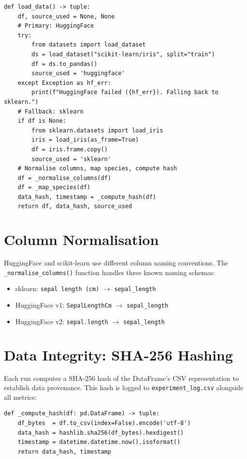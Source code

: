 \documentclass[12pt, a4paper]{report}
\newcommand{\code}[1]{\texttt{\small\textcolor{primary}{#1}}}
\begin{document}
\begin{lstlisting}[caption={Data loading with HuggingFace-to-sklearn fallback},
                   label={lst:dataloader}]
def load_data() -> tuple:
    df, source_used = None, None
    # Primary: HuggingFace
    try:
        from datasets import load_dataset
        ds = load_dataset("scikit-learn/iris", split="train")
        df = ds.to_pandas()
        source_used = 'huggingface'
    except Exception as hf_err:
        print(f"HuggingFace failed ({hf_err}). Falling back to sklearn.")
    # Fallback: sklearn
    if df is None:
        from sklearn.datasets import load_iris
        iris = load_iris(as_frame=True)
        df = iris.frame.copy()
        source_used = 'sklearn'
    # Normalise columns, map species, compute hash
    df = _normalise_columns(df)
    df = _map_species(df)
    data_hash, timestamp = _compute_hash(df)
    return df, data_hash, source_used
\end{lstlisting}

\section{Column Normalisation}

HuggingFace and scikit-learn use different column naming conventions. The
\code{\_normalise\_columns()} function handles three known naming schemas:

\begin{itemize}[itemsep=2pt]
  \item sklearn: \code{sepal length (cm)} $\rightarrow$ \code{sepal\_length}
  \item HuggingFace v1: \code{SepalLengthCm} $\rightarrow$ \code{sepal\_length}
  \item HuggingFace v2: \code{sepal.length} $\rightarrow$ \code{sepal\_length}
\end{itemize}

\section{Data Integrity: SHA-256 Hashing}

Each run computes a SHA-256 hash of the DataFrame's CSV representation to establish
data provenance. This hash is logged to \code{experiment\_log.csv} alongside all metrics:

\begin{lstlisting}[caption={SHA-256 data integrity hash},label={lst:hash}]
def _compute_hash(df: pd.DataFrame) -> tuple:
    df_bytes  = df.to_csv(index=False).encode('utf-8')
    data_hash = hashlib.sha256(df_bytes).hexdigest()
    timestamp = datetime.datetime.now().isoformat()
    return data_hash, timestamp
\end{lstlisting}
\end{document}
